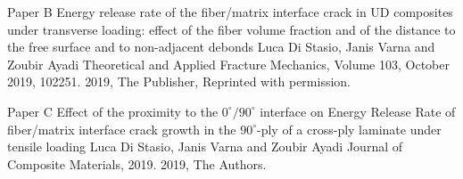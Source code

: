 \documentclass[12pt,a4paper,openright,final,twoside]{msethesisul}
\begin{document}
\newrefsection
\makepaper
  {\paperheader}
  {\papertitle}
  {\paperauthorstring}
  {}
  {\copyrightstring}




\def\paperheader{Paper B}
\def\papertitle{Energy release rate of the fiber/matrix interface crack in UD composites under transverse loading: effect of the fiber volume fraction and of the distance to the free surface and to non-adjacent debonds}
\def\paperauthorstring{Luca Di Stasio, Janis Varna and Zoubir Ayadi}
\def\referencestring{Theoretical and Applied Fracture Mechanics, Volume 103, October 2019, 102251.}
\def\copyrightstring{2019, The Publisher, Reprinted with permission.}


\newrefsection
\makepaper
  {\paperheader}
  {\papertitle}
  {\paperauthorstring}
  {\referencestring}
  {\copyrightstring}



\def\paperheader{Paper C}
\def\papertitle{Effect of the proximity to the $0^{\circ}/90^{\circ}$ interface on Energy Release Rate of fiber/matrix interface crack growth in the  $90^{\circ}$-ply of a cross-ply laminate under tensile loading}
\def\paperauthorstring{Luca Di Stasio, Janis Varna and Zoubir Ayadi}
\def\referencestring{Journal of Composite Materials, 2019.}
\def\copyrightstring{2019, The Authors.}

\newrefsection
\makepapersubmitted
  {\paperheader}
  {\papertitle}
  {\paperauthorstring}
  {\referencestring}
  {\copyrightstring}




\def\paperheader{Paper D}
\def\papertitle{Growth of interface cracks on consecutive fibers: on the same or on the opposite sides?}
\def\paperauthorstring{Luca Di Stasio, Janis Varna and Zoubir Ayadi}
\def\referencestring{Proceedings of the 12$^{th}$ International Conference on Composite Science and Technology (ICCST 12), Materials Today: Proceedings, 2019.}
\def\copyrightstring{2019, The Authors.}
\end{document}
